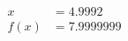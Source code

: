 \documentclass[preview]{standalone}
\begin{document}
\begin{align*}
x &= 4.9992\\f(x) &= 7.9999999
\end{align*}
\end{document}
